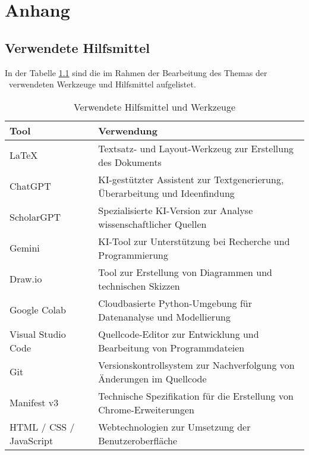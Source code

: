 \chapter{Anhang}

\section{Verwendete Hilfsmittel}
In der Tabelle \ref{tab:tooling} sind die im Rahmen der Bearbeitung des Themas der \IthesisKindDE~verwendeten Werkzeuge und Hilfsmittel aufgelistet.

\begin{table}[!ht]
    \renewcommand{\arraystretch}{1.3}
    \begin{tabular}{|p{3cm}|p{10.5cm}|}
        \hline 
        \rowcolor{lightgray} \textbf{Tool} & \textbf{Verwendung} \\
        \hline
        \LaTeX & Textsatz- und Layout-Werkzeug zur Erstellung des Dokuments \\
        \hline
        ChatGPT & KI-gestützter Assistent zur Textgenerierung, Überarbeitung und Ideenfindung \\
        \hline
        ScholarGPT & Spezialisierte KI-Version zur Analyse wissenschaftlicher Quellen \\
        \hline
        Gemini & KI-Tool zur Unterstützung bei Recherche und Programmierung \\
        \hline
        Draw.io & Tool zur Erstellung von Diagrammen und technischen Skizzen \\
        \hline
        Google Colab & Cloudbasierte Python-Umgebung für Datenanalyse und Modellierung \\
        \hline
        Visual Studio Code & Quellcode-Editor zur Entwicklung und Bearbeitung von Programmdateien \\
        \hline
        Git & Versionskontrollsystem zur Nachverfolgung von Änderungen im Quellcode \\
        \hline
        Manifest v3 & Technische Spezifikation für die Erstellung von Chrome-Erweiterungen \\
        \hline
        HTML / CSS / JavaScript & Webtechnologien zur Umsetzung der Benutzeroberfläche \\
        \hline
    \end{tabular}
    \caption{Verwendete Hilfsmittel und Werkzeuge}
    \label{tab:tooling}
\end{table}

\newpage

